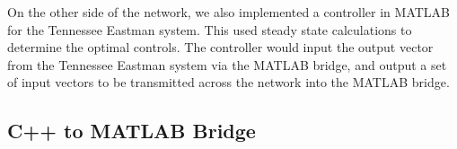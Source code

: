  On the other side of the network, we also implemented a 
  controller in MATLAB for the Tennessee Eastman system.  This
  used steady state calculations to determine the optimal controls.
  The controller would input the output vector from the Tennessee
  Eastman system via the MATLAB bridge, and output a set of input
  vectors to be transmitted across the network into the MATLAB
  bridge.

\subsection{C++ to MATLAB Bridge}


